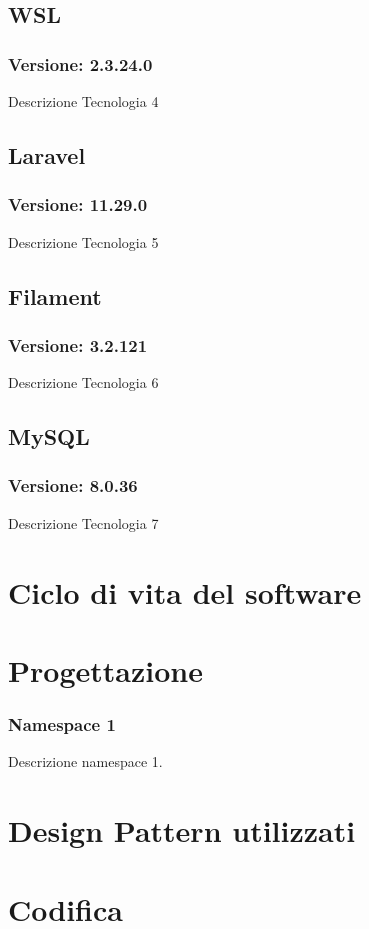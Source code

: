 \subsection{WSL}
\subsubsection{Versione: 2.3.24.0}
Descrizione Tecnologia 4

\subsection{\label{tec:Laravel}Laravel}
\subsubsection{Versione: 11.29.0}
Descrizione Tecnologia 5

\subsection{\label{tec:Filament}Filament}
\subsubsection{Versione: 3.2.121}
Descrizione Tecnologia 6

\subsection{MySQL}
\subsubsection{Versione: 8.0.36}
Descrizione Tecnologia 7

\section{Ciclo di vita del software}
\label{sec:ciclo-vita-software}

\section{Progettazione}
\label{sec:progettazione}

\subsubsection{Namespace 1} %
Descrizione namespace 1.

\begin{namespacedesc}
\end{namespacedesc}


\section{Design Pattern utilizzati}

\section{Codifica}

